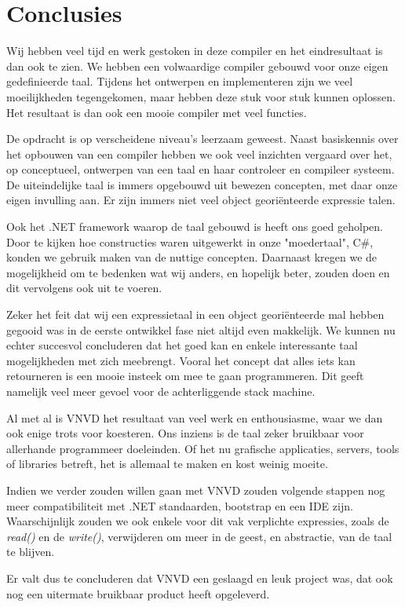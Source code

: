 \section{Conclusies}
Wij hebben veel tijd en werk gestoken in deze compiler en het eindresultaat is dan ook te zien. We hebben een volwaardige compiler gebouwd voor onze eigen gedefinieerde taal. Tijdens het ontwerpen en implementeren zijn we veel moeilijkheden tegengekomen, maar hebben deze stuk voor stuk kunnen oplossen. Het resultaat is dan ook een mooie compiler met veel functies.

De opdracht is op verscheidene niveau's leerzaam geweest. Naast basiskennis over het opbouwen van een compiler hebben we ook veel inzichten vergaard over het, op conceptueel, ontwerpen van een taal en haar controleer en compileer systeem. De uiteindelijke taal is immers opgebouwd uit bewezen concepten, met daar onze eigen invulling aan. Er zijn immers niet veel object geori\"enteerde expressie talen.

Ook het .NET framework waarop de taal gebouwd is heeft ons goed geholpen. Door te kijken hoe constructies waren uitgewerkt in onze "moedertaal", C\#, konden we gebruik maken van de nuttige concepten. Daarnaast kregen we de mogelijkheid om te bedenken wat wij anders, en hopelijk beter, zouden doen en dit vervolgens ook uit te voeren.

Zeker het feit dat wij een expressietaal in een object geori\"enteerde mal hebben gegooid was in de eerste ontwikkel fase niet altijd even makkelijk. We kunnen nu echter succesvol concluderen dat het goed kan en enkele interessante taal mogelijkheden met zich meebrengt. Vooral het concept dat alles iets kan retourneren is een mooie insteek om mee te gaan programmeren. Dit geeft namelijk veel meer gevoel voor de achterliggende stack machine.

Al met al is VNVD het resultaat van veel werk en enthousiasme, waar we dan ook enige trots voor koesteren. Ons inziens is de taal zeker bruikbaar voor allerhande programmeer doeleinden. Of het nu grafische applicaties, servers, tools of libraries betreft, het is allemaal te maken en kost weinig moeite.

Indien we verder zouden willen gaan met VNVD zouden volgende stappen nog meer compatibiliteit met .NET standaarden, bootstrap en een IDE zijn. Waarschijnlijk zouden we ook enkele voor dit vak verplichte expressies, zoals de \textit{read()} en de \textit{write()}, verwijderen om meer in de geest, en abstractie, van de taal te blijven.

Er valt dus te concluderen dat VNVD een geslaagd en leuk project was, dat ook nog een uitermate bruikbaar product heeft opgeleverd.
